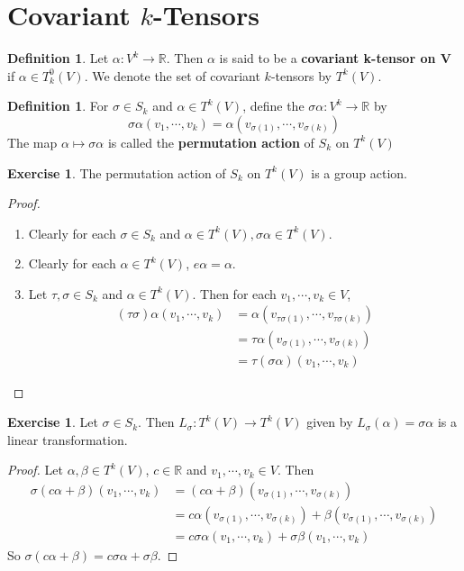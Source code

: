 \documentclass{book}
\theoremstyle{definition}
\newtheorem{defn}[definition]{Definition}
\newtheorem{ex}[definition]{Exercise}
\newcommand{\al}{\alpha}
\newcommand{\be}{\beta}
\newcommand{\sig}{\sigma}
\newcommand{\R}{\mathbb{R}}
\DeclareMathOperator*{\0}{\mbf{0}}
\DeclareMathOperator*{\1}{\mbf{1}}
\begin{document}
	
	\newpage
	\section{Covariant $k$-Tensors}	
	
	\begin{defn}
		Let $\al: V^k \rightarrow \R$. Then $\alpha$ is said to be a \textbf{covariant k-tensor on V} if $\al \in T^0_k(V)$. We denote the set of covariant $k$-tensors by $T^k(V)$.
	\end{defn}

	\begin{defn}
		For $\sig \in S_k$ and $\al \in T^k(V)$, define the $\sig \al : V^k \rightarrow \R$ by $$\sig \al(v_1, \cdots, v_k) = \al(v_{\sig(1)}, \cdots, v_{\sig(k)})$$  The map $\al \mapsto \sig \al$ is called the \textbf{permutation action} of $S_k$ on $T^k(V)$
	\end{defn}

	\begin{ex}
		The permutation action of $S_k$ on $T^k(V)$ is a group action.
	\end{ex}

	\begin{proof} \
		\begin{enumerate}
			\item Clearly for each $\sig \in S_k$ and $\al \in T^k(V), \sig \al \in T^k(V) $.
			\item Clearly for each $\al \in T^k(V)$, $e \al = \al$.
			\item Let $\tau, \sig \in S_k$ and $\al \in T^k(V)$. Then for each $v_1, \cdots, v_k \in V$, 
			\begin{align*}
				(\tau \sig) \al(v_1, \cdots, v_k) 
				&= \al(v_{\tau \sig (1)}, \cdots, v_{\tau \sig (k)}) \\
				&= \tau \al(v_{ \sig (1)}, \cdots, v_{ \sig (k)}) \\ 
				&= \tau (\sig \al) (v_1, \cdots, v_k) 
			\end{align*}
		\end{enumerate}
	\end{proof}

	\begin{ex}
		Let $\sig \in S_k$. Then $L_{\sig}: T^k(V) \rightarrow T^k(V)$ given by $ L_{\sig}(\al) = \sig \al$ is a linear transformation.
	\end{ex}

	\begin{proof}
		Let $\al, \be \in T^k(V)$, $c \in \R$ and $v_1, \cdots, v_k \in V$. Then 
		\begin{align*}
			\sig(c\al + \be)(v_1, \cdots, v_k) 
			&= (c\al + \be)(v_{\sig(1)}, \cdots, v_{\sig(k)}) \\
			&= c \al(v_{\sig(1)}, \cdots, v_{\sig(k)}) + \be(v_{\sig(1)}, \cdots, v_{\sig(k)}) \\
			&= c \sig \al(v_1, \cdots, v_k) + \sig \be(v_1, \cdots, v_k)
		\end{align*}
		So $\sig(c \al + \be) = c\sig \al + \sig \be$.
	\end{proof}
	
\end{document}
